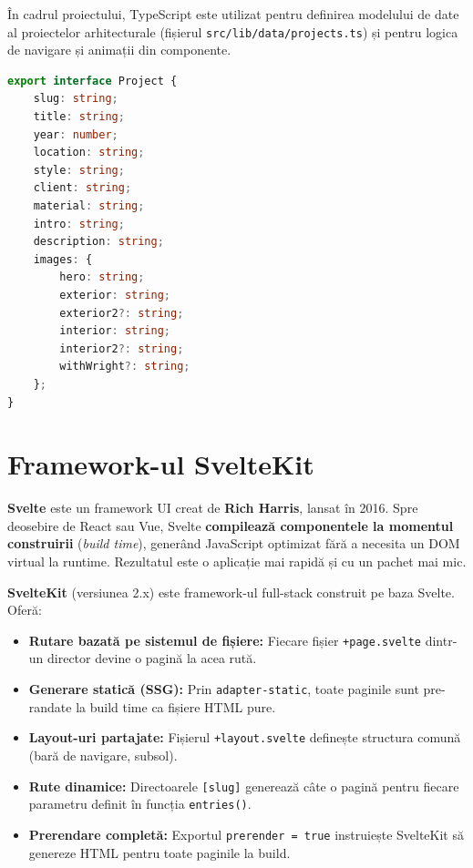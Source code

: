 \documentclass[12pt,a4paper]{report}
\begin{document}
În cadrul proiectului, TypeScript este utilizat pentru definirea modelului de
date al proiectelor arhitecturale (fișierul \texttt{src/lib/data/projects.ts})
și pentru logica de navigare și animații din componente.

\begin{lstlisting}[language=TypeScript,
  caption={Interfața \texttt{Project} din \texttt{src/lib/data/projects.ts}}]
export interface Project {
    slug: string;
    title: string;
    year: number;
    location: string;
    style: string;
    client: string;
    material: string;
    intro: string;
    description: string;
    images: {
        hero: string;
        exterior: string;
        exterior2?: string;
        interior: string;
        interior2?: string;
        withWright?: string;
    };
}
\end{lstlisting}

\section{Framework-ul SvelteKit}

\textbf{Svelte} este un framework UI creat de \textbf{Rich Harris}, lansat în
2016. Spre deosebire de React sau Vue, Svelte \textbf{compilează componentele
la momentul construirii} (\textit{build time}), generând JavaScript optimizat
fără a necesita un DOM virtual la runtime. Rezultatul este o aplicație mai
rapidă și cu un pachet mai mic.

\textbf{SvelteKit} (versiunea 2.x) este framework-ul full-stack construit pe
baza Svelte. Oferă:

\begin{itemize}
  \item \textbf{Rutare bazată pe sistemul de fișiere:} Fiecare fișier
        \texttt{+page.svelte} dintr-un director devine o pagină la acea rută.
  \item \textbf{Generare statică (SSG):} Prin \texttt{adapter-static}, toate
        paginile sunt pre-randate la build time ca fișiere HTML pure.
  \item \textbf{Layout-uri partajate:} Fișierul \texttt{+layout.svelte}
        definește structura comună (bară de navigare, subsol).
  \item \textbf{Rute dinamice:} Directoarele \texttt{[slug]} generează câte o
        pagină pentru fiecare parametru definit în funcția \texttt{entries()}.
  \item \textbf{Prerendare completă:} Exportul \texttt{prerender = true}
        instruiește SvelteKit să genereze HTML pentru toate paginile la build.
\end{itemize}
\end{document}
